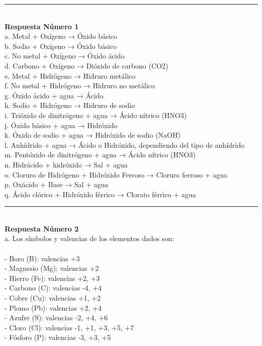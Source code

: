 \documentclass{article}
\begin{document}
\noindent\rule{\textwidth}{1pt} \\
\textbf{Respuesta Número 1} \\
a. Metal + Oxígeno → Óxido básico\\
b. Sodio + Oxígeno → Óxido básico\\
c. No metal + Oxígeno → Óxido ácido\\
d. Carbono + Oxígeno → Dióxido de carbono (CO2)\\
e. Metal + Hidrógeno → Hidruro metálico\\
f. No metal + Hidrógeno → Hidruro no metálico\\
g. Óxido ácido + agua → Ácido\\
h. Sodio + Hidrógeno → Hidruro de sodio\\
i. Trióxido de dinitrógeno + agua → Ácido nítrico (HNO3)\\
j. Óxido básico + agua → Hidróxido\\
k. Óxido de sodio + agua → Hidróxido de sodio (NaOH)\\
l. Anhídrido + agua → Ácido o Hidróxido, dependiendo del tipo de anhídrido\\
m. Pentóxido de dinitrógeno + agua → Ácido nítrico (HNO3)\\
n. Hidrácido + hidróxido → Sal + agua\\
o. Cloruro de Hidrógeno + Hidróxido Ferroso → Cloruro ferroso + agua\\
p. Oxácido + Base → Sal + agua\\
q. Ácido clórico + Hidróxido férrico → Clorato férrico + agua\\
\noindent\rule{\textwidth}{1pt} \\
\textbf{Respuesta Número 2} \\
a. Los símbolos y valencias de los elementos dados son:\\
\\
- Boro (B): valencias +3\\
- Magnesio (Mg): valencias +2\\
- Hierro (Fe): valencias +2, +3\\
- Carbono (C): valencias -4, +4\\
- Cobre (Cu): valencias +1, +2\\
- Plomo (Pb): valencias +2, +4\\
- Azufre (S): valencias -2, +4, +6\\
- Cloro (Cl): valencias -1, +1, +3, +5, +7\\
- Fósforo (P): valencias -3, +3, +5\\
\end{document}
